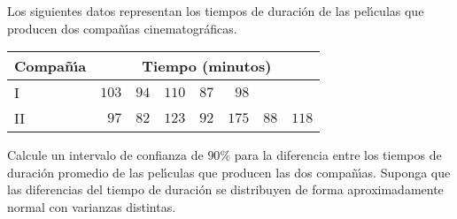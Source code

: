 \begin{enunciado}
 Los siguientes datos representan los tiempos de duraci\'on de las pel\'{\i}culas que producen dos compa\~n\'{\i}as cinematogr\'aficas.
 \begin{center}
  \begin{tabular}{lrrrrrrr}
   \textbf{Compa\~n\'{\i}a} & \multicolumn{7}{c}{\textbf{Tiempo (minutos)}} \\
   \hline 
   I & $103$ & $94$ & $110$ & $87$ & $98$ & & \\
   II & $97$ & $82$ & $123$ & $92$ & $175$ & $88$ & $118$
  \end{tabular}
 \end{center}
 Calcule un intervalo de confianza de $90\%$ para la diferencia entre los tiempos de duraci\'on promedio de las pel\'{\i}culas que producen las dos compa\~n\'{\i}as. Suponga que las diferencias del tiempo de duraci\'on se distribuyen de forma aproximadamente normal con varianzas distintas.
\end{enunciado}

